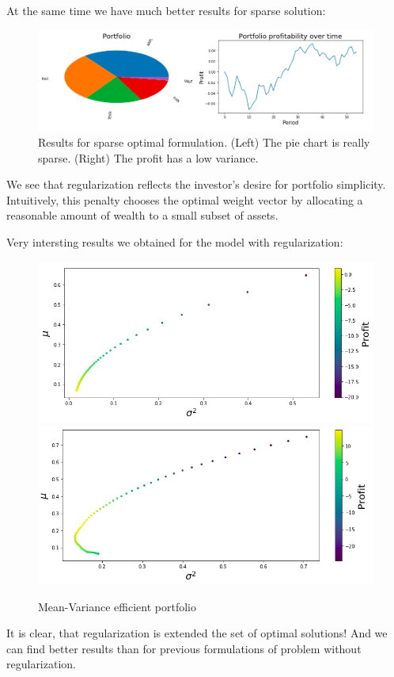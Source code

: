 \documentclass{article}
\begin{document}
At the same time we have much better results for sparse solution:

\begin{figure}[!htb]
\centering
\caption{Results for sparse optimal formulation. (Left) The pie chart is really sparse. (Right) The profit has a low variance.}
\includegraphics[width=1\textwidth]{image2.png}
\end{figure}

We see that regularization reflects the investor’s desire for portfolio simplicity. Intuitively, this penalty chooses the optimal weight vector by allocating a reasonable amount of wealth to a small subset of assets. 

Very intersting results we obtained for the model with regularization:

\begin{figure}[!htb]
\caption{Mean-Variance efficient portfolio}
  \includegraphics[width=\linewidth]{image3.png}
\endminipage\hfill
{}
  \includegraphics[width=\linewidth]{image4.png}
\endminipage
\end{figure}
It is clear, that regularization is extended the set of optimal solutions! And we can find better results than for previous formulations of problem without regularization.
\end{document}
